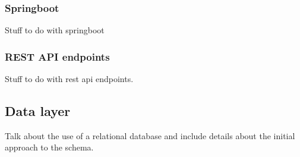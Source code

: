 \subsubsection{Springboot}

Stuff to do with springboot 

\subsubsection{REST API endpoints}

Stuff to do with rest api endpoints.


\subsection{Data layer}

Talk about the use of a relational database and include details about the initial approach to the schema.